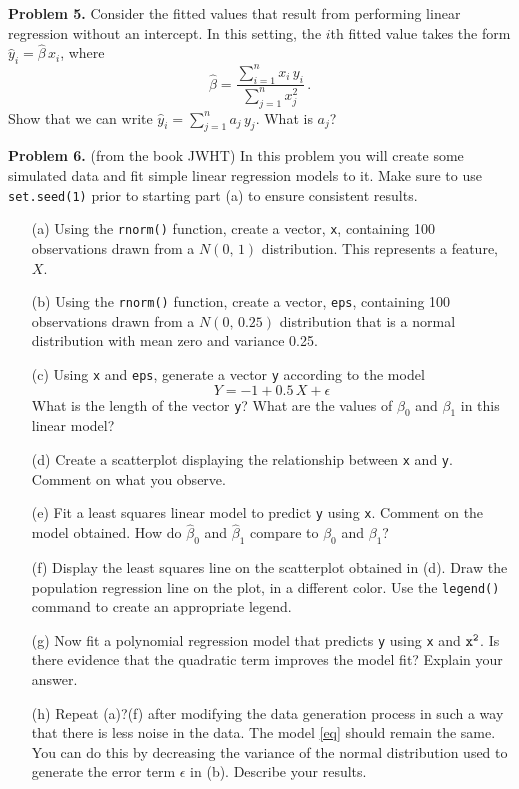 \documentclass[12pt]{report}
\begin{document}
\noindent
{\bf Problem 5.} Consider the fitted values that result from performing linear regression without an intercept. In this setting, the $i$th fitted value takes the form $\widehat{y}_i=\widehat{\beta}\,x_i$, where
$$\widehat{\beta}=\frac{\sum\limits_{i=1}^nx_i\,y_i}{\sum\limits_{j=1}^nx_j^2}\,.$$
Show that we can write $\widehat{y}_i=\sum\limits_{j=1}^na_j\,y_j$. What is $a_j$?

\noindent
{\bf Problem 6.} (from the book JWHT) In this problem you will create some simulated data and fit simple linear regression models to it. Make sure to use {\tt set.seed(1)} prior to starting part (a) to ensure consistent results. 
\begin{itemize}
\item[(a) ] Using the {\tt rnorm()} function, create a vector, {\tt x}, containing 100 observations drawn from a $N(0,\,1)$ distribution. This represents a feature, $X$.  
\item[(b) ] Using the {\tt rnorm()} function, create a vector, {\tt eps}, containing 100 observations drawn from a $N(0,\,0.25)$ distribution that is a normal distribution with mean zero and variance 0.25.
\item[(c) ] Using {\tt x} and {\tt eps}, generate a vector {\tt y} according to the model
\begin{equation}\label{eq}
Y =-1+0.5\,X+\epsilon
\end{equation}
What is the length of the vector {\tt y}? What are the values of $\beta_0$ and $\beta_1$ in this linear model?
\item[(d) ] Create a scatterplot displaying the relationship between {\tt x} and {\tt y}. Comment on what you observe.
\item[(e) ] Fit a least squares linear model to predict {\tt y} using {\tt x}. Comment on the model obtained. How do $\widehat{\beta}_0$ and $\widehat{\beta}_1$ compare to $\beta_0$ and $\beta_1$?
\item[(f) ] Display the least squares line on the scatterplot obtained in (d). Draw the population regression line on the plot, in a different color. Use the {\tt legend()} command to create an appropriate legend.
\item[(g) ] Now fit a polynomial regression model that predicts {\tt y} using {\tt x} and ${\tt x^2}$. Is there evidence that the quadratic term improves the model fit? Explain your answer.
\item[(h) ] Repeat (a)?(f) after modifying the data generation process in such a way that there is less noise in the data. The model \eqref{eq} should remain the same. You can do this by decreasing the variance of the normal distribution used to generate the error term $\epsilon$ in (b). Describe your results.

\end{itemize}
\end{document}
